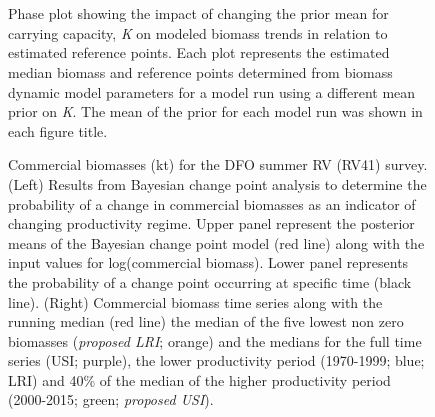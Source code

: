 \documentclass[11pt]{article}
\newcommand{\e}{/backup/bio_data/bio.lobster/figures/} %
\newcommand{\spm}{/backup/bio_data/bio.lobster/spmodelling/lfa41/}
\begin{document}
\begin{landscape}
\begin{figure}
\centering
{}\\
 \\



\caption{Phase plot showing the impact of changing the prior mean for carrying capacity, \emph{K} on modeled biomass trends in relation to estimated reference points. Each plot represents the estimated median biomass and reference points determined from biomass dynamic model parameters for a model run using a different mean prior on \emph{K}. The mean of the prior for each model run was shown in each figure title.}

\end{figure}
\end{landscape}
     \clearpage



\begin{landscape}
\begin{figure}
\centering
       \caption{Commercial biomasses (kt) for the DFO summer RV (RV41) survey. (Left) Results from Bayesian change point analysis to determine the probability of a change in commercial biomasses as an indicator of changing productivity regime. Upper panel represent the posterior means of the Bayesian change point model (red line) along with the input values for log(commercial biomass). Lower panel represents the probability of a change point occurring at specific time (black line). (Right) Commercial biomass time series along with the running median (red line) the median of the five lowest non zero biomasses (\emph{proposed LRI}; orange) and the medians for the full time series (USI; purple), the lower productivity period (1970-1999; blue; LRI) and 40\% of the median of the higher productivity period (2000-2015; green; \emph{proposed USI}). }

\end{figure}
\end{landscape}
\end{document}
